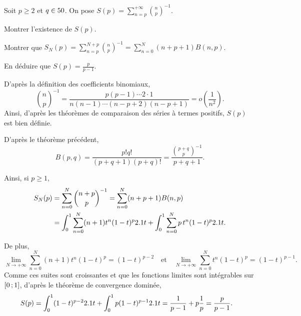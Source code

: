 
\begin{exercice}%
Soit $p \geqslant 2$ et $q \in 50$. On pose $S(p) = \sum\limits_{n=p}^{+\infty} \binom{n}{p}^{-1}$.
\begin{questions}
\item Montrer l'existence de $S(p)$.

\item Montrer que $S_N(p) = \sum\limits_{n=p}^{N+p} \binom{n}{p}^{-1} = \sum\limits_{n=0}^N (n + p + 1) B(n, p)$.

\item En déduire que $S(p) = \frac{p}{p-1}$.
\end{questions}
\end{exercice}

\begin{solution}
\begin{reponses}
\item D'après la définition des coefficients binomiaux,
\[
\binom{n}{p}^{-1} = \frac{p (p-1) \cdots 2 \cdot 1}{n (n-1) \cdots (n-p+2) (n-p+1)} = o\mathopen{}\left(\frac{1}{n^2}\right).
\]
Ainsi, d'après les théorèmes de comparaison des séries à termes positifs, $S(p)$ est bien définie.

\item D'après le théorème précédent,
\[
B(p, q) = \frac{p! q!}{(p + q + 1) (p + q)!} = \frac{\binom{p+q}{p}^{-1}}{p + q + 1}.
\]

Ainsi, si $p \geqslant 1$,
\begin{align*}
S_N(p)
&= \sum_{n=0}^{N} \binom{n+p}{p}^{-1}
= \sum_{n=0}^{N} (n+p+1) B(n, p) \\
&= \int_0^1 \sum_{n=0}^N (n+1) t^n (1 -t)^p 2.1 t + \int_0^1 \sum_{n=0}^N p\, t^n (1 - t)^p 2.1 t.
\end{align*}

De plus,
\[
\lim_{N\to+\infty} \sum_{n=0}^N (n + 1) t^n (1 - t)^p = (1 - t)^{p-2}
\quad \text{et} \quad 
\lim_{N\to+\infty} \sum_{n=0}^N t^n (1 - t)^p = (1 - t)^{p-1}.
\]
Comme ces suites sont croissantes et que les fonctions limites sont intégrables sur $\left[0\,;1\right]$, d'après le théorème de convergence dominée,
\begin{align*}
S(p)
&= \int_0^1 (1 -t)^{p-2} 2.1 t + \int_0^1 p (1 - t)^{p-1} 2.1 t 
= \frac{1}{p-1} + p \frac{1}{p}
= \frac{p}{p-1}.
\end{align*}

\end{reponses}
\end{solution}

